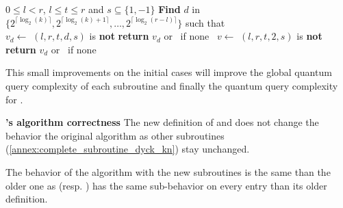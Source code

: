 \begin{algorithm}
    \caption{$\FFP{k}(l,r,t,s)$}\label{alg:ffp_better}
    \begin{algorithmic}
        \Require $0\leq l<r$, $l \leq t \leq r$ and $s \subseteq \{1, -1\}$
        \State \textbf{Find} $d$ in $\{2^{\lceil \log_2(k)\rceil }, 2^{\lceil \log_2(k)+1\rceil },\ldots,2^{\lceil \log_2(r-l)\rceil }\}$
        such that \\
        \hspace*{1cm} $v_d \gets $ $(l,r,t,d,s)$ is \textbf{not} \Null
        \State \textbf{return} $v_d$ or \Null \ if none
        \Else
        \ $v \gets $ $(l,r,t,2,s)$ is \textbf{not} \Null
        \State \textbf{return} $v_d$ or \Null \ if none
        \EndIf
    \end{algorithmic}
\end{algorithm}

This small improvements on the initial cases will improve the global
quantum query complexity of each subroutine and finally the quantum
query complexity for .

\begin{theorem}{\textbf{'s algorithm correctness}} \label{th:subroutine_correctness}
    The new definition of \FA{} and \FFP{} does not change the behavior the original algorithm
    as other subroutines (\autoref{annex:complete_subroutine_dyck_kn}) stay unchanged.
\end{theorem}

\begin{tproof}
    The behavior of the  algorithm with the new subroutines is the same than the older
    one as \FA{} (resp. \FF{}) has the same sub-behavior on every entry than its
    older definition.
\end{tproof}

